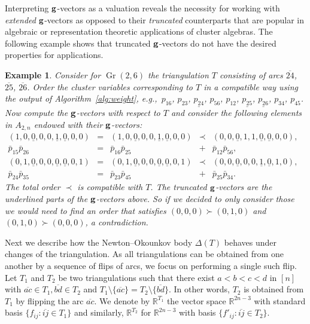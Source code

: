 \documentclass[pdftex]{sigma}%
\newtheorem{Example}[Theorem]{Example}
\numberwithin{equation}{section}
\DeclareMathOperator{\Gr}{Gr}
\begin{document}
Interpreting ${\bf g}$-vectors as a valuation reveals the necessity for working with \emph{extended} ${\bf g}$-vectors as opposed to their \emph{truncated} counterparts that are popular in algebraic or representation theoretic applications of cluster algebras.
The following example shows that truncated ${\bf g}$-vectors do not have the desired properties for applications.

\begin{Example}
Consider for $\Gr(2,6)$ the triangulation $T$ consisting of arcs $\overline{24}$, $\overline{25}$, $\overline{26}$.
Order the cluster variables corresponding to $T$ in a compatible way using the output of Algorithm~\ref{alg:weight}, e.g.,~$p_{16}$, $p_{23}$, $\underline{p_{24}}$, $p_{56}$, $p_{12}$, $\underline{p_{25}}$, $\underline{p_{26}}$, $p_{34}$, $p_{45}$.
Now compute the ${\bf g}$-vectors with respect to $T$ and consider the following elements in $A_{2,n}$ endowed with their ${\bf g}$-vectors:
\begin{displaymath}
\begin{matrix}
(1,0,\underline{0},0,0,\underline{1},\underline{0},0,0) &=& (1,0,\underline{0},0,0,\underline{1},\underline{0},0,0) &\prec&
(0,0,\underline{0},1,1,\underline{0},\underline{0},0,0),\\
 \bar p_{15}\bar p_{26} & = & \bar p_{16}\bar p_{25} & + & \bar p_{12}\bar p_{56},
&&&& \\[1ex]
(0,1,\underline{0},0,0,\underline{0},\underline{0},0,1) & = &
(0,1,\underline{0},0,0,\underline{0},\underline{0},0,1) &\prec& (0,0,\underline{0},0,0,\underline{1},\underline{0},1,0),\\
\bar p_{24}\bar p_{35} & = & \bar p_{23}\bar p_{45} & + & \bar p_{25}\bar p_{34}. %
\end{matrix}
\end{displaymath}
The total order $\prec$ is compatible with $T$.
The truncated ${\bf g}$-vectors are the underlined parts of the ${\bf g}$-vectors above. So if we decided to only consider those we would need to find an order that satisfies $(0,0,0)\succ (0,1,0)$ and $(0,1,0)\succ (0,0,0)$, a contradiction.
\end{Example}

Next we describe how the Newton--Okounkov body $\Delta(T)$ behaves under changes of the triangulation.
As all triangulations can be obtained from one another by a sequence of flips of arcs, we focus on performing a single such flip.
Let $T_1$ and $T_2$ be two triangulations such that there exist $a<b<c<d$ in $[n]$ with $\overline{ac}\in T_1, \overline{bd}\in T_2$ and $T_1\setminus \{\overline{ac}\}=T_2\setminus\{\overline{bd}\}$.
In other words, $T_2$ is obtained from $T_1$ by flipping the arc $\overline{ac}$.
We denote by $\mathbb R^{T_1}$ the vector space $\mathbb R^{2n-3}$ with standard basis $\{f_{ij}\colon \overline{ij}\in T_1\}$ and similarly, $\mathbb R^{T_2}$ for $\mathbb R^{2n-3}$ with basis $\{f'_{ij}\colon \overline{ij}\in T_2\}$.
\end{document}
